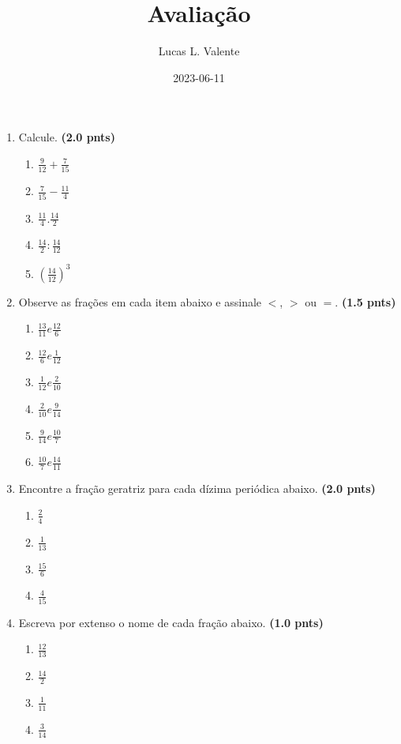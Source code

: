\documentclass{article}
\title{Avaliação}
\author{Lucas L. Valente}
\date{2023-06-11}
\begin{document}
\maketitle
\newpage

\begin{enumerate}
	\item Calcule. \textbf{(2.0 pnts)}

		\begin{enumerate}
			\item $\frac{9}{12} + \frac{7}{15}$
			\item $\frac{7}{15} - \frac{11}{4}$
			\item $\frac{11}{4} . \frac{14}{2}$
			\item $\frac{14}{2} : \frac{14}{12}$
			\item $\left(\frac{14}{12}\right) ^ 3$
		\end{enumerate}

	\item Observe as frações em cada item abaixo e assinale $<$, $>$ ou $=$. \textbf{(1.5 pnts)}

		\begin{enumerate}
			\item $\frac{13}{11} e \frac{12}{6}$
			\item $\frac{12}{6} e \frac{1}{12}$
			\item $\frac{1}{12} e \frac{2}{10}$
			\item $\frac{2}{10} e \frac{9}{14}$
			\item $\frac{9}{14} e \frac{10}{7}$
			\item $\frac{10}{7} e \frac{14}{11}$
		\end{enumerate}

	\item Encontre a fração geratriz para cada dízima periódica abaixo. \textbf{(2.0 pnts)}

		\begin{enumerate}
			\item $\frac{2}{4}$
			\item $\frac{1}{13}$
			\item $\frac{15}{6}$
			\item $\frac{4}{15}$
		\end{enumerate}

	\item Escreva por extenso o nome de cada fração abaixo. \textbf{(1.0 pnts)}

		\begin{enumerate}
			\item $\frac{12}{13}$
			\item $\frac{14}{2}$
			\item $\frac{1}{11}$
			\item $\frac{3}{14}$
		\end{enumerate}


\end{enumerate}
\end{document}
